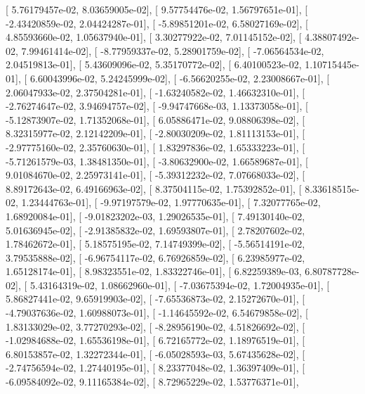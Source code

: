 \documentclass{article}
\begin{document}
       [  5.76179457e-02,   8.03659005e-02],
       [  9.57754476e-02,   1.56797651e-01],
       [ -2.43420859e-02,   2.04424287e-01],
       [ -5.89851201e-02,   6.58027169e-02],
       [  4.85593660e-02,   1.05637940e-01],
       [  3.30277922e-02,   7.01145152e-02],
       [  4.38807492e-02,   7.99461414e-02],
       [ -8.77959337e-02,   5.28901759e-02],
       [ -7.06564534e-02,   2.04519813e-01],
       [  5.43609096e-02,   5.35170772e-02],
       [  6.40100523e-02,   1.10715445e-01],
       [  6.60043996e-02,   5.24245999e-02],
       [ -6.56620255e-02,   2.23008667e-01],
       [  2.06047933e-02,   2.37504281e-01],
       [ -1.63240582e-02,   1.46632310e-01],
       [ -2.76274647e-02,   3.94694757e-02],
       [ -9.94747668e-03,   1.13373058e-01],
       [ -5.12873907e-02,   1.71352068e-01],
       [  6.05886471e-02,   9.08806398e-02],
       [  8.32315977e-02,   2.12142209e-01],
       [ -2.80030209e-02,   1.81113153e-01],
       [ -2.97775160e-02,   2.35760630e-01],
       [  1.83297836e-02,   1.65333223e-01],
       [ -5.71261579e-03,   1.38481350e-01],
       [ -3.80632900e-02,   1.66589687e-01],
       [  9.01084670e-02,   2.25973141e-01],
       [ -5.39312232e-02,   7.07668033e-02],
       [  8.89172643e-02,   6.49166963e-02],
       [  8.37504115e-02,   1.75392852e-01],
       [  8.33618515e-02,   1.23444763e-01],
       [ -9.97197579e-02,   1.97770635e-01],
       [  7.32077765e-02,   1.68920084e-01],
       [ -9.01823202e-03,   1.29026535e-01],
       [  7.49130140e-02,   5.01636945e-02],
       [ -2.91385832e-02,   1.69593807e-01],
       [  2.78207602e-02,   1.78462672e-01],
       [  5.18575195e-02,   7.14749399e-02],
       [ -5.56514191e-02,   3.79535888e-02],
       [ -6.96754117e-02,   6.76926859e-02],
       [  6.23985977e-02,   1.65128174e-01],
       [  8.98323551e-02,   1.83322746e-01],
       [  6.82259389e-03,   6.80787728e-02],
       [  5.43164319e-02,   1.08662960e-01],
       [ -7.03675394e-02,   1.72004935e-01],
       [  5.86827441e-02,   9.65919903e-02],
       [ -7.65536873e-02,   2.15272670e-01],
       [ -4.79037636e-02,   1.60988073e-01],
       [ -1.14645592e-02,   6.54679858e-02],
       [  1.83133029e-02,   3.77270293e-02],
       [ -8.28956190e-02,   4.51826692e-02],
       [ -1.02984688e-02,   1.65536198e-01],
       [  6.72165772e-02,   1.18976519e-01],
       [  6.80153857e-02,   1.32272344e-01],
       [ -6.05028593e-03,   5.67435628e-02],
       [ -2.74756594e-02,   1.27440195e-01],
       [  8.23377048e-02,   1.36397409e-01],
       [ -6.09584092e-02,   9.11165384e-02],
       [  8.72965229e-02,   1.53776371e-01],
\end{document}
